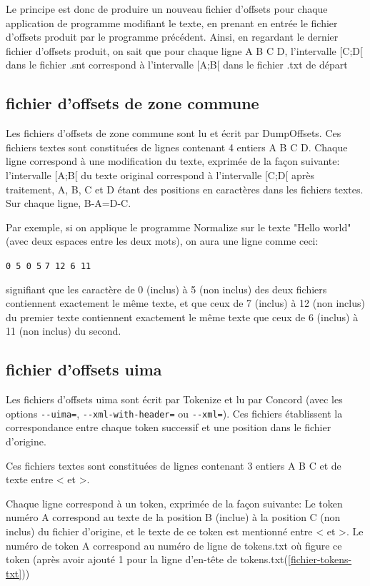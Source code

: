 \bigskip

Le principe est donc de produire un nouveau fichier d'offsets pour chaque application de programme modifiant le texte, en prenant en entrée le fichier d'offsets produit par le programme précédent. Ainsi, en regardant le dernier fichier d'offsets produit, on sait que pour chaque ligne A B C D, l'intervalle [C;D[ dans le fichier .snt correspond à l'intervalle [A;B[ dans le fichier .txt de départ


\subsection{fichier d'offsets de zone commune}
\label{subsection-offsets-common}

Les fichiers d'offsets de zone commune sont lu et écrit par DumpOffsets.
\bigskip
Ces fichiers textes sont constituées de lignes contenant 4 entiers A B C D. Chaque ligne correspond à une modification du texte, exprimée de la façon suivante:
\bigskip
l'intervalle [A;B[ du texte original correspond à l'intervalle [C;D[ après traitement, A, B, C et D étant des positions en caractères dans les fichiers textes. Sur chaque ligne, B-A=D-C.
\bigskip

Par exemple, si on applique le programme Normalize sur le texte "Hello world" (avec deux espaces entre les deux mots), on aura une ligne comme ceci:

\bigskip
\noindent \verb+0 5 0 5+
\newline
\noindent \verb+7 12 6 11+
\bigskip

signifiant que les caractère de 0 (inclus) à 5 (non inclus) des deux fichiers contiennent exactement le même texte, et que ceux de 7 (inclus) à 12 (non inclus) du premier texte
contiennent exactement le même texte que ceux de 6 (inclus) à 11 (non inclus) du second.



\subsection{fichier d'offsets uima}
\label{subsection-offsets-uima}
Les fichiers d'offsets uima sont écrit par Tokenize et lu par Concord (avec les options \verb$--uima=$, \verb$--xml-with-header=$ ou \verb$--xml=$). Ces fichiers établissent la correspondance entre chaque token successif et une position dans le fichier d'origine.

\bigskip
Ces fichiers textes sont constituées de lignes contenant 3 entiers A B C et de texte entre < et >.

\bigskip
Chaque ligne correspond à un token, exprimée de la façon suivante:
Le token numéro A correspond au texte de la position B (inclue) à la position C (non inclus) du fichier d'origine, et le texte de ce token est mentionné entre < et >.
Le numéro de token A correspond au numéro de ligne de tokens.txt où figure ce token (après avoir ajouté 1 pour la ligne d'en-tête de tokens.txt(\ref{fichier-tokens-txt}))

\bigskip
